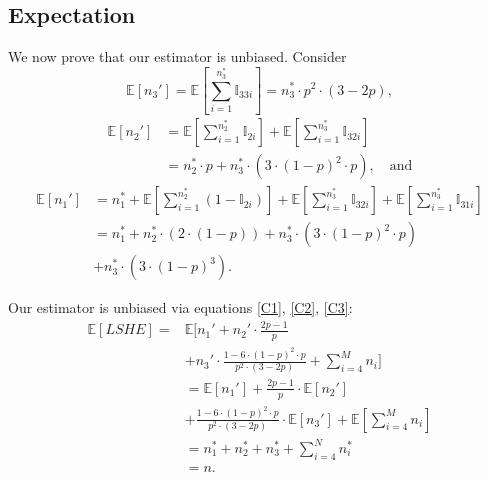 \documentclass[aoas]{imsart}
\begin{document}
\subsection{Expectation}
We now prove that our estimator is unbiased. Consider
\begin{equation}
\label{C3}
\mathbb{E}[n_3']= \mathbb{E}[\sum_{i=1}^{n_3^*}{\mathbb{I}_{33i}}]= n_3^* \cdot p^2 \cdot (3-2p),
\end{equation}
\begin{equation}
\label{C2}
\begin{split}
\mathbb{E}[n_2'] &=    \mathbb{E}[\sum_{i=1}^{n_2^*}{\mathbb{I}_{2i}}] + \mathbb{E}[\sum_{i=1}^{n_3^*}{\mathbb{I}_{32i}}]     \\
&= n_2^* \cdot p + n_3^*\cdot (3\cdot(1-p)^2\cdot p), \quad \text{and}
\end{split}
\end{equation}
\begin{equation}
\label{C1}
\begin{split}
\mathbb{E}[n_1']&= n_1^*+
\mathbb{E}[\sum_{i=1}^{n_2^*}{(1-\mathbb{I}_{2i})}] + \mathbb{E}[\sum_{i=1}^{n_3^*}{\mathbb{I}_{32i}}] + \mathbb{E}[\sum_{i=1}^{n_3^*}{\mathbb{I}_{31i}}]\\
&= n_1^* + n_2^* \cdot(2\cdot(1-p)) + n_3^* \cdot (3\cdot (1-p)^2\cdot p) \\
&+ n_3^* \cdot (3\cdot(1-p)^3 ).
\end{split}
\end{equation}

Our estimator is unbiased via equations \ref{C1}, \ref{C2}, \ref{C3}:
\begin{equation*}
\begin{split}
\mathbb{E}[LSHE] =&\mathbb{E}[n_1' +  n_2' \cdot \frac{2p-1}{p}  \\
&+ n_3' \cdot \frac{1-6 \cdot (1-p)^2 \cdot p}{p^2 \cdot (3-2p) }
+ \sum_{i=4}^{M} n_i] \\
& = \mathbb{E}[n_1'] +  \frac{2p-1}{p} \cdot \mathbb{E}[n_2']    \\
&+ \frac{1-6 \cdot (1-p)^2 \cdot p}{p^2 \cdot (3-2p)} \cdot \mathbb{E}[n_3']   +  \mathbb{E}[\sum_{i=4}^{M}n_i]\\
& = n_1^* + n_2^* + n_3^* + \sum_{i=4}^{N}n_i^*\\
& = n.
\end{split}
\end{equation*}
\end{document}

